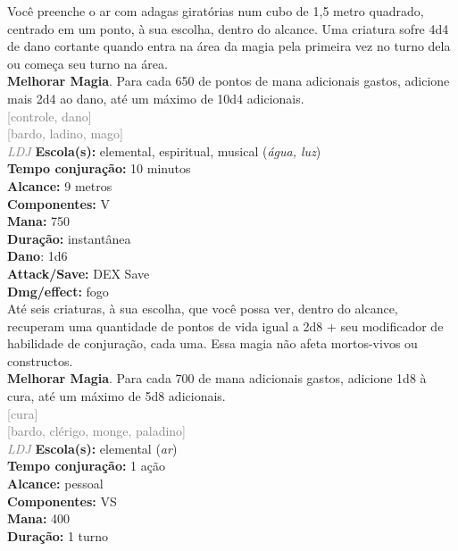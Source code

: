 \documentclass{RPG_Adventure}[2021/10/20]
\begin{document}
{\normalsize Você preenche o ar com adagas giratórias num cubo de 1,5 metro quadrado, centrado em um ponto, à sua escolha, dentro do alcance. Uma criatura sofre 4d4 de dano cortante quando entra na área da magia pela primeira vez no turno dela ou começa seu turno na área.\\\t \textbf{Melhorar Magia}. Para cada 650 de pontos de mana adicionais gastos, adicione mais 2d4 ao dano, até um máximo de 10d4 adicionais.\\}
{\scriptsize \textcolor{gray}{[controle, dano]\\}}
{\scriptsize \textcolor{gray}{[bardo, ladino, mago]\\}}
{\tiny \textcolor{gray}{\textit{LDJ}}}
{\small \t \textbf{Escola(s):} elemental, espiritual, musical (\textit{água, luz})\\\t \textbf{Tempo conjuração:} 10 minutos\\\t \textbf{Alcance:} 9 metros\\\t \textbf{Componentes:} V\\\t \textbf{Mana:} 750\\\t \textbf{Duração:} instantânea\\\t \textbf{Dano}: 1d6\\\t \textbf{Attack/Save:} DEX Save\\\t \textbf{Dmg/effect:} fogo\\}
{\normalsize Até seis criaturas, à sua escolha, que você possa ver, dentro do alcance, recuperam uma quantidade de pontos de vida igual a 2d8 + seu modificador de habilidade de conjuração, cada uma. Essa magia não afeta mortos-vivos ou constructos.\\\t \textbf{Melhorar Magia}. Para cada 700 de mana adicionais gastos, adicione 1d8 à cura, até um máximo de 5d8 adicionais.\\}
{\scriptsize \textcolor{gray}{[cura]\\}}
{\scriptsize \textcolor{gray}{[bardo, clérigo, monge, paladino]\\}}
{\tiny \textcolor{gray}{\textit{LDJ}}}
{\small \t \textbf{Escola(s):} elemental (\textit{ar})\\\t \textbf{Tempo conjuração:} 1 ação\\\t \textbf{Alcance:} pessoal\\\t \textbf{Componentes:} VS\\\t \textbf{Mana:} 400\\\t \textbf{Duração:} 1 turno\\}
\end{document}
